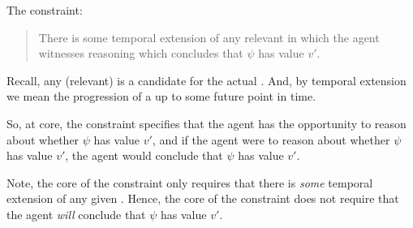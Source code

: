 
\begin{note}[Constraint]
  The constraint:
  \begin{quote}
    There is some temporal extension of any relevant \epVW{} in which the agent witnesses reasoning which concludes that \(\psi\) has value \(v'\).
  \end{quote}

  Recall, any (relevant) \epVW{} is a candidate for the actual \world{}.
  And, by temporal extension we mean the progression of a \world{} up to some future point in time.

  So, at core, the constraint specifies that the agent has the opportunity to reason about whether \(\psi\) has value \(v'\), and if the agent were to reason about whether \(\psi\) has value \(v'\), the agent would conclude that \(\psi\) has value \(v'\).

  Note, the core of the constraint only requires that there is \emph{some} temporal extension of any given \epVW{}.
  Hence, the core of the constraint does not require that the agent \emph{will} conclude that \(\psi\) has value \(v'\).
\end{note}

